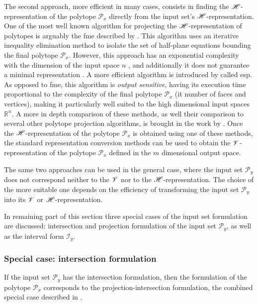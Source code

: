 The second approach, more efficient in many cases, consists in finding the $\mathscr{H}$-representation of the polytope $\mathcal{P}_x$ directly from the input set's $\mathscr{H}$-representation. One of the most well known algorithm for projecting the $\mathscr{H}$-representation of polytopes is arguably the \gls{fme} described by \citet{dantzig1973fourier}.  This algorithm uses an iterative inequality elimination method to isolate the set of half-plane equations bounding the final polytope $\mathcal{P}_x$. However, this approach has an exponential complexity with the dimension of the input space $n$ \cite{Talaashrafi2020complexity}, and additionally it does not guarantee a minimal representation \cite{Monniaux2010}. A more efficient algorithm is introduced by \citet{jones2004equality} called \gls{esp}. As opposed to \gls{fme}, this algorithm is \textit{output sensitive}, having its execution time proportional to the complexity of the final polytope $\mathcal{P}_x$ (it number of faces and vertices), making it particularly well suited to the high dimensional input spaces $\mathbb{R}^n$. A more in depth comparison of these methods, as well their comparison to several other polytope projection algorithms, is brought in the work by \citet{Gl_le_2018}. Once the $\mathscr{H}$-representation of the polytope $\mathcal{P}_x$ is obtained using one of these methods, the standard representation conversion methods can be used to obtain the $\mathscr{V}$-representation of the polytope $\mathcal{P}_x$ defined in the $m$ dimensional output space.

The same two approaches can be used in the general case, where the input set $\mathcal{P}_y$ does not correspond neither to the $\mathscr{V}$ nor to the $\mathscr{H}$-representation. The choice of the more suitable one depends on the efficiency of transforming the input set $\mathcal{P}_y$ into its $\mathscr{V}$ or $\mathscr{H}$-representation. 

In remaining part of this section three special cases of the input set formulation are discussed: intersection and projection formulation of the input set $\mathcal{P}_y$, as well as the interval form $\mathcal{I}_y$.

\subsubsection*{Special case: intersection formulation} If the input set $\mathcal{P}_y$ has the intersection formulation, then the formulation of the polytope $\mathcal{P}_x$ corresponds to the projection-intersection formulation, the combined special case  described in .

